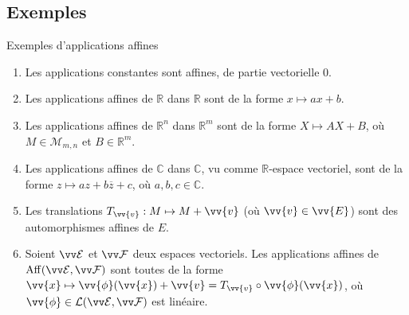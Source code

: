 \documentclass{m53beamer}
\begin{document}
\subsection{Exemples}
  \begin{frame}{Exemples d'applications affines}
    \begin{enumerate}[<+(1)->]
      \item Les applications constantes sont affines, de partie vectorielle $0$.
      \item Les applications affines de $\mathbb{R}$ dans $\mathbb{R}$ sont de la forme $x \mapsto ax+b$.
      \item Les applications affines de $\mathbb{R}^{n}$ dans $\mathbb{R}^{m}$ sont de la forme $X \mapsto AX+B$, où $M \in \mathcal{M}_{m,n}$ et $B \in \mathbb{R}^{m}$.
      \item Les applications affines de $\mathbb{C}$ dans $\mathbb{C}$, vu comme $\mathbb{R}$-espace vectoriel, sont de la forme $z \mapsto az+b\overline{z}+c$, où $a,b,c \in \mathbb{C}$.
      \item Les translations $T_{\vv{v}}:M \mapsto M+\vv{v}$ (où $\vv{v} \in \vv{E}$) sont des automorphismes affines de $E$.
      \item Soient $\ev{E}$ et $\ev{F}$ deux espaces vectoriels. Les applications affines de $\aff(\ev{E},\ev{F})$ sont toutes de la forme $\vv{x} \mapsto \vv{\phi}(\vv{x}) + \vv{v}=T_{\vv{v}}\circ\vv{\phi}(\vv{x})$, où $\vv{\phi} \in \lin(\ev{E},\ev{F})$ est linéaire.
    \end{enumerate}
  \end{frame}

\end{document}
